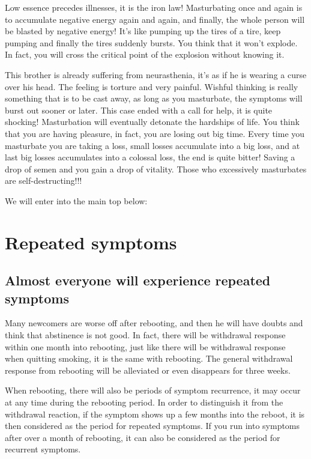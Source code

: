 \documentclass[
]{book}
\begin{document}
Low essence precedes illnesses, it is the iron law! Masturbating once and again is to accumulate negative energy again and again, and finally, the whole person will be blasted by negative energy! It's like pumping up the tires of a tire, keep pumping and finally the tires suddenly bursts. You think that it won't explode. In fact, you will cross the critical point of the explosion without knowing it.

This brother is already suffering from neurasthenia, it's as if he is wearing a curse over his head. The feeling is torture and very painful. Wishful thinking is really something that is to be cast away, as long as you masturbate, the symptoms will burst out sooner or later. This case ended with a call for help, it is quite shocking! Masturbation will eventually detonate the hardships of life. You think that you are having pleasure, in fact, you are losing out big time. Every time you masturbate you are taking a loss, small losses accumulate into a big loss, and at last big losses accumulates into a colossal loss, the end is quite bitter! Saving a drop of semen and you gain a drop of vitality. Those who excessively masturbates are self-destructing!!!

We will enter into the main top below:

\hypertarget{repeated-symptoms}{%
\section{Repeated symptoms}\label{repeated-symptoms}}

\hypertarget{almost-everyone-will-experience-repeated-symptoms}{%
\subsection{Almost everyone will experience repeated symptoms}\label{almost-everyone-will-experience-repeated-symptoms}}

Many newcomers are worse off after rebooting, and then he will have doubts and think that abstinence is not good. In fact, there will be withdrawal response within one month into rebooting, just like there will be withdrawal response when quitting smoking, it is the same with rebooting. The general withdrawal response from rebooting will be alleviated or even disappears for three weeks.

When rebooting, there will also be periods of symptom recurrence, it may occur at any time during the rebooting period. In order to distinguish it from the withdrawal reaction, if the symptom shows up a few months into the reboot, it is then considered as the period for repeated symptoms. If you run into symptoms after over a month of rebooting, it can also be considered as the period for recurrent symptoms.
\end{document}
